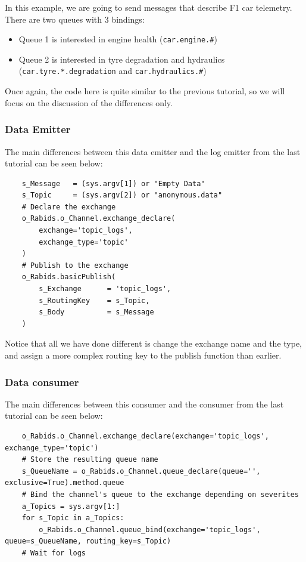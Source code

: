 \documentclass{article}
\begin{document}
In this example, we are going to send messages that describe F1 car telemetry. There are two queues with 3 bindings:

\begin{itemize}
    \item Queue 1 is interested in engine health (\verb|car.engine.#|)
    \item Queue 2 is interested in tyre degradation and hydraulics (\verb|car.tyre.*.degradation| and \verb|car.hydraulics.#|)
\end{itemize}

Once again, the code here is quite similar to the previous tutorial, so we will focus on the discussion of the differences only.

\subsubsection{Data Emitter}

The main differences between this data emitter and the log emitter from the last tutorial can be seen below:

\begin{verbatim}
    s_Message   = (sys.argv[1]) or "Empty Data"
    s_Topic     = (sys.argv[2]) or "anonymous.data"
    # Declare the exchange
    o_Rabids.o_Channel.exchange_declare(
        exchange='topic_logs', 
        exchange_type='topic'
    )
    # Publish to the exchange
    o_Rabids.basicPublish(
        s_Exchange      = 'topic_logs',
        s_RoutingKey    = s_Topic,
        s_Body          = s_Message
    )
\end{verbatim}

Notice that all we have done different is change the exchange name and the type, and assign a more complex routing key to the publish function than earlier.

\subsubsection{Data consumer}

The main differences between this consumer and the consumer from the last tutorial can be seen below:

\begin{verbatim}
    o_Rabids.o_Channel.exchange_declare(exchange='topic_logs', exchange_type='topic')
    # Store the resulting queue name
    s_QueueName = o_Rabids.o_Channel.queue_declare(queue='', exclusive=True).method.queue
    # Bind the channel's queue to the exchange depending on severites
    a_Topics = sys.argv[1:]
    for s_Topic in a_Topics:
        o_Rabids.o_Channel.queue_bind(exchange='topic_logs', queue=s_QueueName, routing_key=s_Topic)
    # Wait for logs
\end{verbatim}
\end{document}

